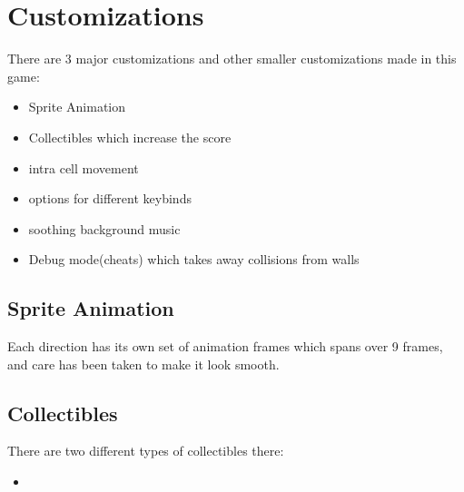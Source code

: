 \documentclass{article}
\begin{document}
\section{Customizations}
There are 3 major customizations and other smaller customizations made in this game:
\begin{itemize}
    \item Sprite Animation
    \item Collectibles which increase the score
    \item intra cell movement
    \item options for different keybinds
    \item soothing background music
    \item Debug mode(cheats) which takes away collisions from walls
\end{itemize}
\subsection{Sprite Animation}
Each direction has its own set of animation frames which spans over 9 frames, and care has been taken to make it look smooth.\\
\subsection{Collectibles}
There are two different types of collectibles there:
\begin{itemize}
    \item 
\end{itemize}
\end{document}
